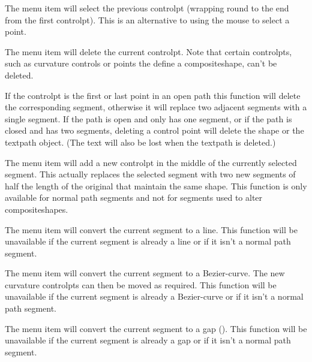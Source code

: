 
The  menu item will select the previous \gls{controlpt}
(wrapping round to the end from the first \gls{controlpt}).
This is an alternative to using the mouse to select a point.


The  menu item will delete the current
\gls{controlpt}. 
Note that certain \glspl{controlpt}, such as curvature controls or points
the define a \gls{compositeshape}, can't be deleted.

If the \gls{controlpt} is the first or last point in an open path
this function will delete the corresponding segment, otherwise it
will replace two adjacent segments with a single segment.  If the
path is open and only has one segment, or if the path is closed and
has two segments, deleting a control point will delete the
\gls{shape} or the \gls{textpath} object. (The text will also be lost when
the \gls{textpath} is deleted.)


The  menu item will add a new
\gls{controlpt} in the middle of the currently selected segment.
This actually replaces the selected segment with two new segments of 
half the length of the original that maintain the same shape.
This function is only available for normal path segments and not for
segments used to alter \glspl{compositeshape}.


The  menu item will convert the
current segment to a line. This function will be unavailable if the
current segment is already a line or if it isn't a normal path segment.


The  menu item will convert the
current segment to a \gls{Bezier-curve}. The new curvature 
\glspl{controlpt} can then be moved as required.
This function will be unavailable if the
current segment is already a \gls{Bezier-curve} or if it isn't a normal path segment.


The  menu item will convert the
current segment to a \gls{gap} (). This function will be
unavailable if the current segment is already a \gls{gap} or if it
isn't a normal path segment.

